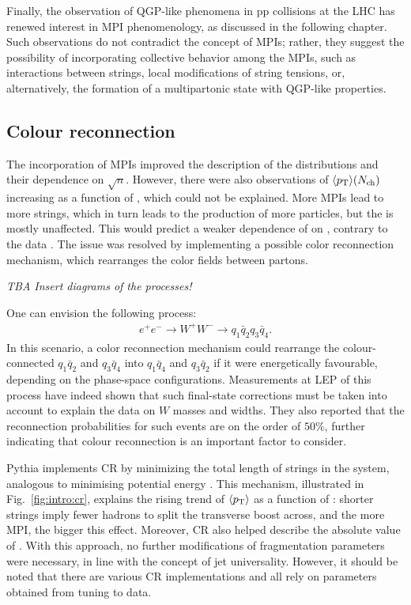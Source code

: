 Finally, the observation of QGP-like phenomena in pp collisions at the LHC has renewed interest in MPI phenomenology, as discussed in the following chapter. Such observations do not contradict the concept of MPIs; rather, they suggest the possibility of incorporating collective behavior among the MPIs, such as interactions between strings, local modifications of string tensions, or, alternatively, the formation of a multipartonic state with QGP-like properties.

\subsection{Colour reconnection}

The incorporation of MPIs improved the description of the \Nch distributions and their dependence on $\sqrt{n}$. However, there were also observations of $\langle p_{\text{T}} \rangle(N_{\text{ch}})$ increasing as a function of \Nch, which could not be explained. More MPIs lead to more strings, which in turn leads to the production of more particles, but the \pt is mostly unaffected. This would predict a weaker dependence of \meanpt on \Nch, contrary to the data \cite{sjostrandDevelopmentMPIModelling2017}. The issue was resolved by implementing a possible color reconnection mechanism, which rearranges the color fields between partons.

\textit{TBA Insert diagrams of the processes!}

One can envision the following process:
\begin{align*}
e^+ e^- \rightarrow W^+ W^- \rightarrow q_1\bar{q}_2 q_3\bar{q}_4  .
\end{align*}
In this scenario, a color reconnection mechanism could rearrange the colour-connected $q_1\bar{q}_2$ and $q_3\bar{q}_4$ into $q_1\bar{q}_4$ and $q_3\bar{q}_2$ if it were energetically favourable, depending on the phase-space configurations. Measurements at LEP \cite{ElectroweakMeasurementsElectron2013} of this process have indeed shown that such final-state corrections must be taken into account to explain the data on $W$ masses and widths. They also reported that the reconnection probabilities for such events are on the order of $50\%$, further indicating that colour reconnection is an important factor to consider.

Pythia implements CR by minimizing the total length of strings in the system, analogous to minimising potential energy \cite{bierlichComprehensiveGuidePhysics2022}. This mechanism, illustrated in Fig.~\ref{fig:intro:cr}, explains the rising trend of $\langle p_{\text{T}} \rangle$ as a function of \Nch: shorter strings imply fewer hadrons to split the transverse boost across, and the more MPI, the bigger this effect. Moreover, CR also helped describe the absolute value of \meanpt. With this approach, no further modifications of fragmentation parameters were necessary, in line with the concept of jet universality. However, it should be noted that there are various CR implementations and all rely on parameters obtained from tuning to data.

